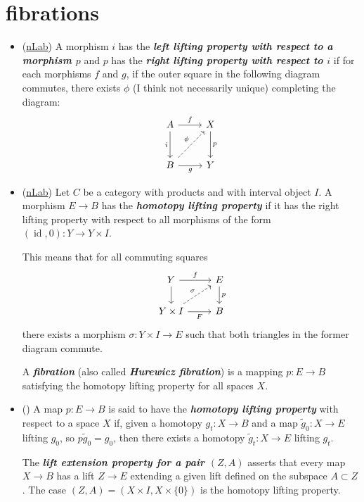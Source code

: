 \documentclass{article}
\DeclareMathOperator{\id}{id}
\begin{document}
\section{fibrations}
\begin{itemize}
	\item (\href{https://ncatlab.org/nlab/show/lift}{nLab}) A morphism $i$ has the \textbf{\textit{left lifting property with respect to a morphism $p$}} and $p$ has the \textbf{\textit{right lifting property with respect to $i$}} if for each morphisms $f$ and $g$, if the outer square in the following diagram commutes, there exists $\phi$ (I think not necessarily unique) completing the diagram:
	\[\begin{tikzcd}[row sep=large]
		A\arrow[r,"f"]\arrow[d,"i",swap]&X\arrow[d,"p"]\\
		B\arrow[r,"g",swap]\arrow[ur,dashed,"\phi"]&Y
	\end{tikzcd}\]
	\item (\href{https://ncatlab.org/nlab/show/homotopy+lifting+property}{nLab}) Let $C$ be a category with products and with interval object $I$. A morphism $E\to B$ has the \textbf{\textit{homotopy lifting property}} if it has the right lifting property with respect to all morphisms of the form $(\id,0):Y\to Y\times I$.
	
	This means that for all commuting squares
	\[\begin{tikzcd}
		Y\arrow[r,"f"]\arrow[d]&E\arrow[d,"p"]\\
		Y\times I\arrow[r,swap,"F"]\arrow[ur,dashed,"\sigma"]&B
	\end{tikzcd}\]
	there exists a morphism $\sigma:Y\times I\to E$ such that both triangles in the former diagram commute.
	
	A \textbf{\textit{fibration}} (also called \textbf{\textit{Hurewicz fibration}}) is a mapping $p:E\to B$ satisfying the homotopy lifting property for all spaces $X$.
	
	\item (\cite{hatcher-at}) A map $p:E\to B$ is said to have the \textbf{\textit{homotopy lifting property}} with respect to a space $X$ if, given a homotopy $g_t:X\to B$ and a map $\tilde{g}_0:X\to E$ lifting $g_0$, so $p\tilde{g}_0=g_0$, then there exists a homotopy $\tilde{g}_t:X\to E$ lifting $g_t$.
	
	The \textbf{\textit{lift extension property for a pair $(Z,A)$}} asserts that every map $X\to B$ has a lift $Z\to E$ extending a given lift defined on the subspace $A\subset Z$. The case $(Z,A)=(X\times I,X\times\{0\})$ is the homotopy lifting property.
	

\end{itemize}
\end{document}
